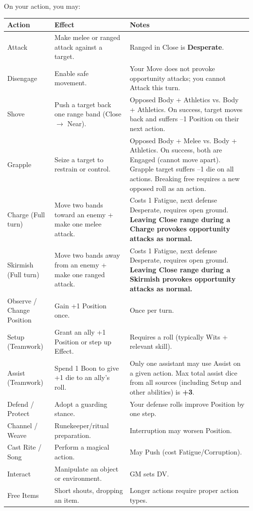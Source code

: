 On your action, you may:

\begin{tabular}{|p{2.8cm}|p{6cm}|p{3.5cm}|}
\hline
\textbf{Action} & \textbf{Effect} & \textbf{Notes} \\
\hline
Attack & Make melee or ranged attack against a target. & Ranged in Close is \textbf{Desperate}. \\
\hline
Disengage & Enable safe movement. & Your Move does not provoke opportunity attacks; you cannot Attack this turn. \\
\hline
Shove & Push a target back one range band (Close $\rightarrow$ Near). & Opposed Body + Athletics vs. Body + Athletics. On success, target moves back and suffers --1 Position on their next action. \\
\hline
Grapple & Seize a target to restrain or control. & Opposed Body + Melee vs. Body + Athletics. On success, both are Engaged (cannot move apart). Grapple target suffers --1 die on all actions. Breaking free requires a new opposed roll as an action. \\
\hline
Charge (Full turn) & Move two bands toward an enemy + make one melee attack. & Costs 1 Fatigue, next defense Desperate, requires open ground. \textbf{Leaving Close range during a Charge provokes opportunity attacks as normal.} \\
\hline
Skirmish (Full turn) & Move two bands away from an enemy + make one ranged attack. & Costs 1 Fatigue, next defense Desperate, requires open ground. \textbf{Leaving Close range during a Skirmish provokes opportunity attacks as normal.} \\
\hline
Observe / Change Position & Gain +1 Position once. & Once per turn. \\
\hline
Setup (Teamwork) & Grant an ally +1 Position or step up Effect. & Requires a roll (typically Wits + relevant skill). \\
\hline
Assist (Teamwork) & Spend 1 Boon to give +1 die to an ally's roll. & Only one assistant may use Assist on a given action. Max total assist dice from all sources (including Setup and other abilities) is \textbf{+3}. \\
\hline
Defend / Protect & Adopt a guarding stance. & Your defense rolls improve Position by one step. \\
\hline
Channel / Weave & Runekeeper/ritual preparation. & Interruption may worsen Position. \\
\hline
Cast Rite / Song & Perform a magical action. & May Push (cost Fatigue/Corruption). \\
\hline
Interact & Manipulate an object or environment. & GM sets DV. \\
\hline
Free Items & Short shouts, dropping an item. & Longer actions require proper action types. \\
\hline
\end{tabular}

